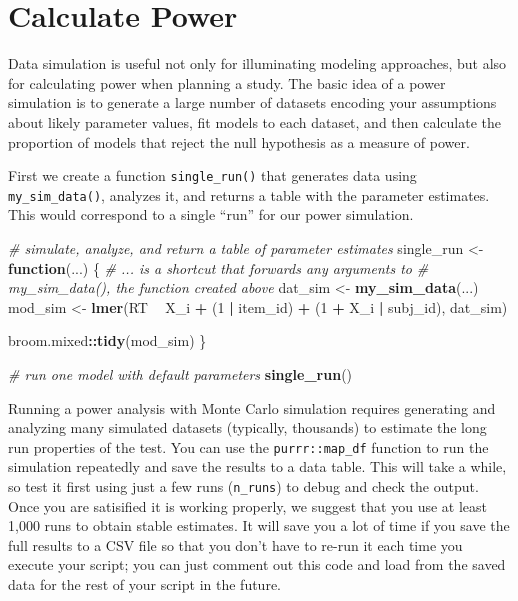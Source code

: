 \documentclass[english,doc,floatsintext]{apa6}
\newenvironment{Shaded}{\begin{snugshade}}{\end{snugshade}}
\newcommand{\CommentTok}[1]{\textcolor[rgb]{0.56,0.35,0.01}{\textit{#1}}}
\newcommand{\ControlFlowTok}[1]{\textcolor[rgb]{0.13,0.29,0.53}{\textbf{#1}}}
\newcommand{\DecValTok}[1]{\textcolor[rgb]{0.00,0.00,0.81}{#1}}
\newcommand{\KeywordTok}[1]{\textcolor[rgb]{0.13,0.29,0.53}{\textbf{#1}}}
\newcommand{\NormalTok}[1]{#1}
\newcommand{\OperatorTok}[1]{\textcolor[rgb]{0.81,0.36,0.00}{\textbf{#1}}}
\newcommand{\StringTok}[1]{\textcolor[rgb]{0.31,0.60,0.02}{#1}}
\begin{document}
\hypertarget{calculate-power}{%
\section{Calculate Power}\label{calculate-power}}

Data simulation is useful not only for illuminating modeling approaches, but also for calculating power when planning a study. The basic idea of a power simulation is to generate a large number of datasets encoding your assumptions about likely parameter values, fit models to each dataset, and then calculate the proportion of models that reject the null hypothesis as a measure of power.

First we create a function \texttt{single\_run()} that generates data using \texttt{my\_sim\_data()}, analyzes it, and returns a table with the parameter estimates. This would correspond to a single \enquote{run} for our power simulation.

\begin{Shaded}
\begin{Highlighting}[]
\CommentTok{# simulate, analyze, and return a table of parameter estimates}
\NormalTok{single_run <-}\StringTok{ }\ControlFlowTok{function}\NormalTok{(...) \{}
  \CommentTok{# ... is a shortcut that forwards any arguments to }
  \CommentTok{# my_sim_data(), the function created above}
\NormalTok{  dat_sim <-}\StringTok{ }\KeywordTok{my_sim_data}\NormalTok{(...)}
\NormalTok{  mod_sim <-}\StringTok{ }\KeywordTok{lmer}\NormalTok{(RT }\OperatorTok{~}\StringTok{ }\NormalTok{X_i }\OperatorTok{+}\StringTok{ }\NormalTok{(}\DecValTok{1} \OperatorTok{|}\StringTok{ }\NormalTok{item_id) }\OperatorTok{+}\StringTok{ }\NormalTok{(}\DecValTok{1} \OperatorTok{+}\StringTok{ }\NormalTok{X_i }\OperatorTok{|}\StringTok{ }\NormalTok{subj_id),}
\NormalTok{                dat_sim)}
  
\NormalTok{  broom.mixed}\OperatorTok{::}\KeywordTok{tidy}\NormalTok{(mod_sim)}
\NormalTok{\}}
\end{Highlighting}
\end{Shaded}

\begin{Shaded}
\begin{Highlighting}[]
\CommentTok{# run one model with default parameters}
\KeywordTok{single_run}\NormalTok{()}
\end{Highlighting}
\end{Shaded}

Running a power analysis with Monte Carlo simulation requires generating and analyzing many simulated datasets (typically, thousands) to estimate the long run properties of the test. You can use the \texttt{purrr::map\_df} function to run the simulation repeatedly and save the results to a data table. This will take a while, so test it first using just a few runs (\texttt{n\_runs}) to debug and check the output. Once you are satisified it is working properly, we suggest that you use at least 1,000 runs to obtain stable estimates. It will save you a lot of time if you save the full results to a CSV file so that you don't have to re-run it each time you execute your script; you can just comment out this code and load from the saved data for the rest of your script in the future.
\end{document}
